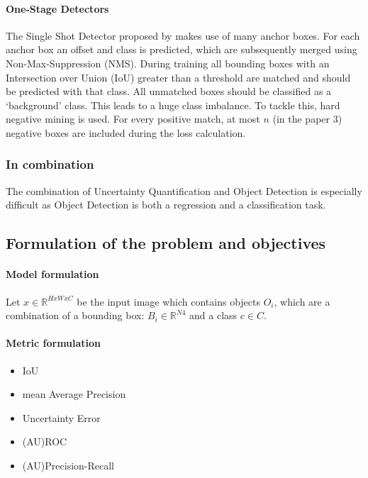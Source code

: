 \paragraph*{One-Stage Detectors}
The Single Shot Detector proposed by \citep{liu2016ssd} makes use of many anchor boxes. For each anchor box an offset and class is predicted, which are subsequently merged using Non-Max-Suppression (NMS). During training all bounding boxes with an Intersection over Union (IoU) greater than a threshold are matched and should be predicted with that class. All unmatched boxes should be classified as a `background' class. This leads to a huge class imbalance. To tackle this, hard negative mining is used. For every positive match, at most $n$ (in the paper 3) negative boxes are included during the loss calculation.




\subsubsection{In combination}\label{sec:broadliterature:combination}
The combination of Uncertainty Quantification and Object Detection is especially difficult as Object Detection is both a regression and a classification task.

\cite{Gasperini_2022}

\subsection{Formulation of the problem and objectives}
\paragraph*{Model formulation}
Let $x \in \mathbb{R}^{HxWxC}$ be the input image which contains objects $O_i$, which are a combination of a bounding box: $B_i \in \mathbb{R}^{N4}$ and a class $c \in C$.

\paragraph*{Metric formulation}

\begin{itemize}
    \item IoU
    \item mean Average Precision
    \item Uncertainty Error \cite{miller2019evaluating}
    \item (AU)ROC \cite{miller2019evaluating}
    \item (AU)Precision-Recall \cite{saito2015pr}
\end{itemize}

